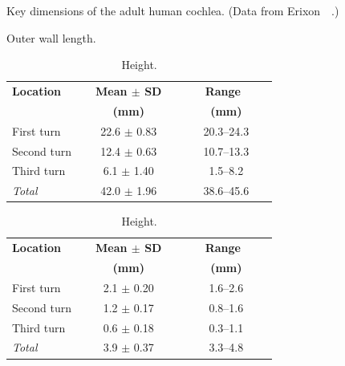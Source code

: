 \begin{table}
	\centering
	\sffamily
	\small
	
	\caption[Key dimensions of the adult human cochlea]{Key dimensions of the adult
	human cochlea. (Data from Erixon~\etal~\cite{erixon2009}.)}
	\label{table:cochlea_dimensions}
	
	\begin{subtable}[t]{0.47\textwidth}
        \caption{Outer wall length.}
        \label{table:dimensions_outer_wall}

        \begin{tabularx}{\textwidth}{X c c}
			\toprule
			\textbf{Location} 	& \textbf{~~Mean $ \boldsymbol\pm $ SD~~}	& \textbf{~~~Range~~~~}\\
								& \textbf{(mm)}								& \textbf{(mm)} \\
			\midrule
			
			First turn		& 22.6 $ \pm $ 0.83 		& 20.3--24.3\\
			Second turn		& 12.4 $ \pm $ 0.63 		& 10.7--13.3\\
			Third turn		& 6.1 $ \pm $ 1.40			& 1.5--8.2\\[1.5mm]
			\emph{Total}	& 42.0 $ \pm $ 1.96			& 38.6--45.6\\
			
			\bottomrule
		\end{tabularx}
		
    \end{subtable}
    
    \vspace{1em}
	\begin{subtable}[t]{0.47\textwidth}
        \caption{Height.}
        \label{table:dimensions_height}

        \begin{tabularx}{\textwidth}{X c c}
			\toprule
			\textbf{Location} 	& \textbf{~~Mean $ \boldsymbol\pm $ SD~~}	& \textbf{~~~Range~~~~}\\
								& \textbf{(mm)}								& \textbf{(mm)} \\
			\midrule
			
			First turn		& 2.1 $ \pm $ 0.20			& 1.6--2.6\\
			Second turn		& 1.2 $ \pm $ 0.17 			& 0.8--1.6\\
			Third turn		& 0.6 $ \pm $ 0.18 			& 0.3--1.1\\[1.5mm]
			\emph{Total}	& 3.9 $ \pm $ 0.37 			& 3.3--4.8\\
			
			\bottomrule
		\end{tabularx}
		

\end{subtable}
\end{table}
